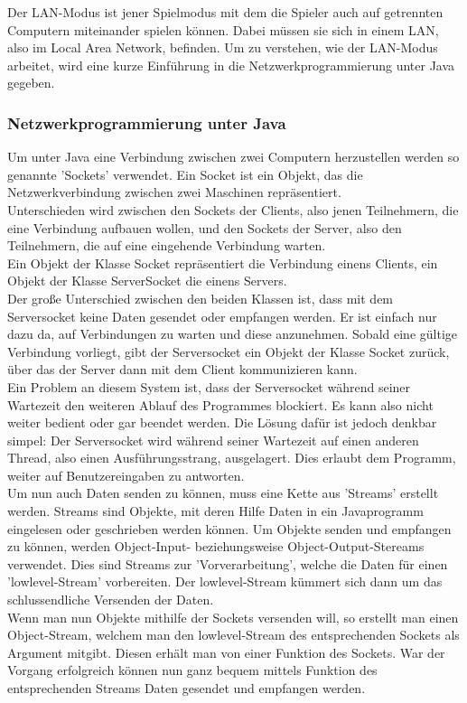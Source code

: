 \documentclass[12pt,a4paper]{article}
\begin{document}
Der LAN-Modus ist jener Spielmodus mit dem die Spieler auch auf getrennten Computern miteinander spielen können. Dabei müssen sie sich in einem LAN, also im Local Area Network, befinden. Um zu verstehen, wie der LAN-Modus arbeitet, wird eine kurze Einführung in die Netzwerkprogrammierung unter Java gegeben. 

\subsubsection{Netzwerkprogrammierung unter Java}

Um unter Java eine Verbindung zwischen zwei Computern herzustellen werden so genannte 'Sockets' verwendet. Ein Socket ist ein Objekt, das die Netzwerkverbindung zwischen zwei Maschinen repräsentiert.\\
Unterschieden wird zwischen den Sockets der Clients, also jenen Teilnehmern, die eine Verbindung aufbauen wollen, und den Sockets der Server, also den Teilnehmern, die auf eine eingehende Verbindung warten.\\
Ein Objekt der Klasse Socket repräsentiert die Verbindung einens Clients, ein Objekt der Klasse ServerSocket die einens Servers.\\
Der große Unterschied zwischen den beiden Klassen ist, dass mit dem Serversocket keine Daten gesendet oder empfangen werden. Er ist einfach nur dazu da, auf  Verbindungen zu warten und diese anzunehmen. Sobald eine gültige Verbindung vorliegt, gibt der Serversocket ein Objekt der Klasse Socket zurück, über das der Server dann mit dem Client kommunizieren kann.\\[2ex]
Ein Problem an diesem System ist, dass der Serversocket während seiner Wartezeit den weiteren Ablauf des Programmes blockiert. Es kann also nicht weiter bedient oder gar beendet werden. Die Lösung dafür ist jedoch denkbar simpel: Der Serversocket wird während seiner Wartezeit auf einen anderen Thread, also einen Ausführungsstrang, ausgelagert. Dies erlaubt dem Programm, weiter auf Benutzereingaben zu antworten.\\[3ex]
Um nun auch Daten senden zu können, muss eine Kette aus 'Streams' erstellt werden. Streams sind Objekte, mit deren Hilfe Daten in ein Javaprogramm eingelesen oder geschrieben werden können. 
Um Objekte senden und empfangen zu können, werden Object-Input- beziehungsweise Object-Output-Stereams verwendet. Dies sind Streams zur 'Vorverarbeitung', welche die Daten für einen 'lowlevel-Stream' vorbereiten. Der lowlevel-Stream kümmert sich dann um das schlussendliche Versenden der Daten. \\[2ex]
Wenn man nun Objekte mithilfe der Sockets versenden will, so erstellt man einen Object-Stream, welchem man den lowlevel-Stream des entsprechenden Sockets als Argument mitgibt. Diesen erhält man von einer Funktion des Sockets. War der Vorgang erfolgreich können nun ganz bequem mittels Funktion des entsprechenden Streams Daten gesendet und empfangen werden.
\end{document}
